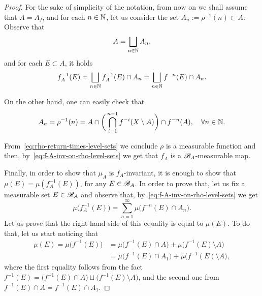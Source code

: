 \begin{proof}
  For the sake of simplicity of the notation, from now on we shall assume that $A=A_{f}$, and for each $n\in\mathbb{N}$, let us consider the set $A_{n}:=\rho^{-1}(n)\subset A$.
  Observe that
  \begin{displaymath}
    A=\bigsqcup_{n\in\mathbb{N}} A_{n},
  \end{displaymath}
  and for each $E\subset A$, it holds
  \begin{equation}
    \label{eq:f-A-inv-on-rho-level-sets}
    f_{A}^{-1}(E)=\bigsqcup_{n\in\mathbb{N}} f_{A}^{-1}(E)\cap A_{n} = \bigsqcup_{n\in\mathbb{N}} f^{-n}(E)\cap A_{n}.
  \end{equation}

  On the other hand, one can easily check that
  \begin{equation}
    \label{eq:rho-return-times-level-sets}
    A_{n}=\rho^{-1}(n)=A\cap \bigg(\bigcap_{i=1}^{n-1} f^{-i}(X\setminus A)\bigg) \cap f^{-n}(A), \quad\forall n\in\mathbb{N}.
  \end{equation}

  From~\eqref{eq:rho-return-times-level-sets} we conclude $\rho$ is a measurable function and then, by~\eqref{eq:f-A-inv-on-rho-level-sets} we get that $f_{A}$ is a $\mathscr{B}_{A}$-measurable map.

  Finally, in order to show that $\mu_{A}$ is $f_{A}$-invariant, it is enough to show that $\mu(E)=\mu(f^{-1}_{A}(E))$, for any $E\in\mathscr{B}_{A}$. In order to prove that, let us fix a measurable set $E\in\mathscr{B}_{A}$ and observe that, by~\eqref{eq:f-A-inv-on-rho-level-sets} we get
  \begin{displaymath}
    \mu\big(f_{A}^{-1}(E)\big) = \sum_{n=1}^{\infty}\mu\big(f^{-n}(E)\cap A_{n}\big).
  \end{displaymath}
  Let us prove that the right hand side of this equality is equal to $\mu(E)$. To do that, let us start noticing that
  \begin{equation}
    \label{eq:mu-E-equal-m-f-1-E-partition-A}
    \begin{split}
      \mu(E)=\mu\big(f^{-1}(E)\big) &= \mu\big(f^{-1}(E)\cap A\big) + \mu\big(f^{-1}(E)\setminus A\big) \\
      &= \mu\big(f^{-1}(E)\cap A_{1}\big) + \mu\big(f^{-1}(E)\setminus A\big),
    \end{split}
  \end{equation}
  where the first equality follows from the fact $f^{-1}(E)=\big(f^{-1}(E)\cap A\big)\sqcup \big(f^{-1}(E)\setminus A\big)$, and the second one from $f^{-1}(E)\cap A=f^{-1}(E)\cap A_{1}$.


\end{proof}
